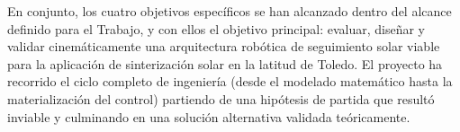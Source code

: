 En conjunto, los cuatro objetivos específicos se han alcanzado dentro del alcance definido para el Trabajo, y con ellos el objetivo principal: evaluar, diseñar y validar cinemáticamente una arquitectura robótica de seguimiento solar viable para la aplicación de sinterización solar en la latitud de Toledo. El proyecto ha recorrido el ciclo completo de ingeniería (desde el modelado matemático hasta la materialización del control) partiendo de una hipótesis de partida que resultó inviable y culminando en una solución alternativa validada teóricamente.